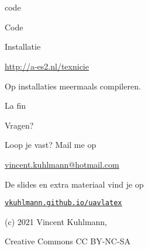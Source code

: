 \documentclass[presentatie.tex]{subfiles}
\begin{document}
\section{\texorpdfstring{}{Goed om te weten}}%

\clearrecentlist
    

\begin{saveblock}{code}
	\begin{highlightblock}[gobble=8,linewidth=0.5\textwidth,framexleftmargin=0.25em]
        Code
	\end{highlightblock}
\end{saveblock}

\begin{frame}
    {Installatie}

    \centering\url{http://a-es2.nl/texnicie}
\end{frame}

\begin{frame}
    Op installaties meermaals compileren.
\end{frame}

\begin{frame}{La fin}
	\begin{center}
		\LARGE Vragen?
	\end{center}

    \bigskip
	

    \begin{center}
        Loop je vast? Mail me op\par
        \url{vincent.kuhlmann@hotmail.com}
    \end{center}

    \begin{center}
        De slides en extra materiaal vind je op\par
        \href{https://vkuhlmann.github.io/uavlatex}{\ul{\texttt{vkuhlmann.github.io/uavlatex}}}
    \end{center}
    \begin{center}
        (c) 2021 Vincent Kuhlmann,\par
        Creative Commons CC BY-NC-SA
    \end{center}
\end{frame}
\end{document}
